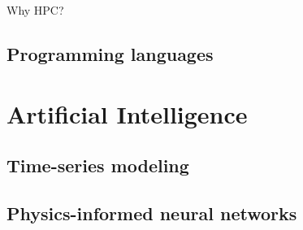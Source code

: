 Why HPC?

\subsection{Programming languages}

\section{Artificial Intelligence}

\subsection{Time-series modeling}

\subsection{Physics-informed neural networks}

